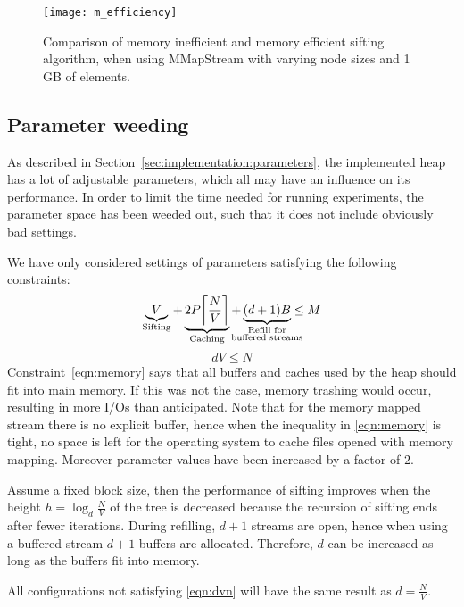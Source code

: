 \begin{figure}
  \centering
  \texttt{[image: m\_efficiency]}
  \caption{Comparison of memory inefficient and memory efficient sifting algorithm, when using MMapStream with varying node sizes and 1 GB of elements.}
  \label{fig:m-efficiency}
\end{figure}

\subsection{Parameter weeding}
As described in Section~\ref{sec:implementation:parameters}, the implemented heap has a lot of adjustable parameters, which all may have an influence on its performance. In order to limit the time needed for running experiments, the parameter space has been weeded out, such that it does not include obviously bad settings.

We have only considered settings of parameters satisfying the following constraints:
\begin{equation}
  \label{eqn:memory}
  \underbrace{V}_{\textrm{Sifting}} + \underbrace{2P \ceil*{\frac{N}{V}}}_{\textrm{Caching}} + \underbrace{(d + 1)B}_{\mathclap{\substack{
  \textrm{Refill for}\\\textrm{buffered streams}
  }}} \leq M
\end{equation}
\begin{equation}
  \label{eqn:dvn}
  dV\leq N
\end{equation}
Constraint~\ref{eqn:memory} says that all buffers and caches used by the heap should fit into main memory. If this was not the case, memory trashing would occur, resulting in more I/Os than anticipated. Note that for the memory mapped stream there is no explicit buffer, hence when the inequality in \eqref{eqn:memory} is tight, no space is left for the operating system to cache files opened with memory mapping. Moreover parameter values have been increased by a factor of $2$.

Assume a fixed block size, then the performance of sifting improves when the height $h = \log_d{\frac{N}{V}}$ of the tree is decreased because the recursion of sifting ends after fewer iterations. During refilling, $d+1$ streams are open, hence when using a buffered stream $d+1$ buffers are allocated. Therefore, $d$ can be increased as long as the buffers fit into memory.

All configurations not satisfying \eqref{eqn:dvn} will have the same result as $d=\frac{N}{V}$.


